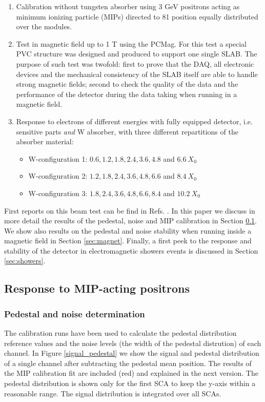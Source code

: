 \documentclass[final,3p,times,twocolumn]{elsarticle}
\begin{document}
\begin{enumerate}
\item Calibration without tungsten absorber using 3 GeV positrons acting as minimum ionizing particle (MIPs) directed to 81 position equally distributed over the modules.
\item Test in magnetic field up to 1 T using the PCMag. For this test a special PVC structure was
designed and produced to support one single SLAB.	
The purpose of such test was twofold: first to prove that the DAQ, all electronic devices and the 
mechanical consistency of the SLAB itself are able
to handle strong magnetic fields; 
second to check the quality of the data and the performance of the detector during the data taking when running
in a magnetic field.
\item Response to electrons of different energies with fully equipped detector, i.e. sensitive parts {\it and} W absorber, with three different repartitions of the absorber material:
\begin{itemize}
\item W-configuration 1: $0.6,1.2,1.8,2.4,3.6,4.8$ and $6.6~X_{0}$
\item W-configuration 2: $1.2,1.8,2.4,3.6,4.8,6.6$ and $8.4~X_{0}$
\item W-configuration 3: $1.8,2.4,3.6,4.8,6.6,8.4$ and $10.2~X_{0}$
\end{itemize}
\end{enumerate}

First reports on this beam test can be find in
Refs. \cite{Irles:2018uum,Irles:2018hcd}. In this paper we discuss in more detail
the results of the pedestal, noise and MIP calibration in Section \ref{sec:calib}.
We show also results on the pedestal and noise stability when running inside
a magnetic field in Section \ref{sec:magnet}. Finally, a first peek to the 
response and stability of the detector in electromagnetic showers events is discussed in 
Section \ref{sec:showers}. 

\subsection{Response to MIP-acting positrons}
\label{sec:calib}

\subsubsection{Pedestal and noise determination}
\label{sec:pedestal}

The calibration runs have been used to calculate the pedestal distribution reference values 
and the noise levels (the width of the pedestal distrution) of each channel.
In Figure \ref{signal_pedestal} we show the signal and pedestal distribution of a single channel after
subtracting the pedestal mean position. The results of the MIP calibration fit are included (red) and explained in the next version.
The pedestal distribution is shown only for the first SCA to keep the y-axis within a reasonable range.
The signal distribution is integrated over all SCAs.
\end{document}
